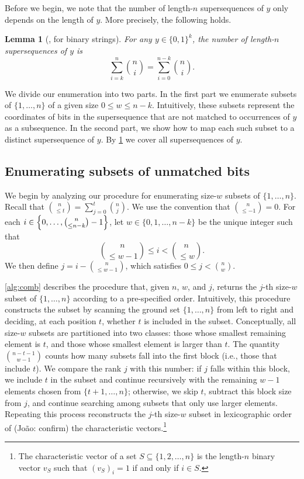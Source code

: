 \documentclass[11pt]{article}
\newtheorem{lemma}{Lemma}
\newcommand{\bits}{\{0,1\}}
\newcommand{\jnote}[1]{{\color{red} \footnotesize(João: #1)}}
\let\originalleft\left
\let\originalright\right
\renewcommand{\left}{\mathopen{}\mathclose\bgroup\originalleft}
\renewcommand{\right}{\aftergroup\egroup\originalright}
\begin{document}
Before we begin, we note that the number of length-$n$ supersequences of $y$ only depends on the length of $y$.
More precisely, the following holds.


\begin{lemma}[\cite{CS75}, for binary strings]
\label{lem:num_superseq}
For any $y\in\bits^k$, the number of length-$n$ supersequences of $y$ is
\begin{equation*}
    \sum_{i = k}^{n} \binom{n}{i} = \sum_{i=0}^{n-k} \binom{n}{i}.
\end{equation*}
\end{lemma}

We divide our enumeration into two parts.
In the first part we enumerate subsets of $\{1,\dots,n\}$ of a given size $0\leq w\leq n-k$.
Intuitively, these subsets represent the coordinates of bits in the supersequence that are not matched to occurrences of $y$ as a subsequence.
In the second part, we show how to map each such subset to a distinct supersequence of $y$.
By \cref{lem:num_superseq} we cover all supersequences of $y$.

\subsection{Enumerating subsets of unmatched bits}\label{sec:enum-subsets}

We begin by analyzing our procedure for enumerating size-$w$ subsets of $\{1,\dots,n\}$.
Recall that $\binom{n}{\leq t}=\sum_{j=0}^t \binom{n}{j}$.
We use the convention that $\binom{n}{\leq -1}=0$.
For each $i \in \left\{0, \ldots, \binom{n}{\leq n-k}-1 \right\}$, let $w \in \{0,1,\ldots,n-k\}$ be the unique integer such that
\begin{equation*}
    \binom{n}{\leq w-1} \leq i <\binom{n}{\leq w}.
\end{equation*}
We then define $j = i - \binom{n}{\leq w-1}$, which satisfies $0 \leq j < \binom{n}{w}$.

\cref{alg:comb} describes the procedure that, given $n$, $w$, and $j$, returns the $j$-th size-$w$ subset of $\{1,\dots,n\}$ according to a pre-specified order. 
Intuitively, this procedure constructs the subset by scanning the ground set $\{1,\dots,n\}$ from left to right and deciding, at each position $t$, whether $t$ is included in the subset. Conceptually, all size-$w$ subsets are partitioned into two classes: those whose smallest remaining element is $t$, and those whose smallest element is larger than $t$. The quantity $\binom{n-t-1}{w-1}$ counts how many subsets fall into the first block (i.e., those that include $t$). We compare the rank $j$ with this number: if $j$ falls within this block, we include $t$ in the subset and continue recursively with the remaining $w-1$ elements chosen from $\{t+1,\dots,n\}$; otherwise, we skip $t$, subtract this block size from $j$, and continue searching among subsets that only use larger elements. Repeating this process reconstructs the $j$-th size-$w$ subset in lexicographic order of \jnote{confirm} the characteristic vectors.\footnote{The characteristic vector of a set $S\subseteq\{1,2,\dots,n\}$ is the length-$n$ binary vector $v_S$ such that $(v_S)_i=1$ if and only if $i\in S$.}
\end{document}

